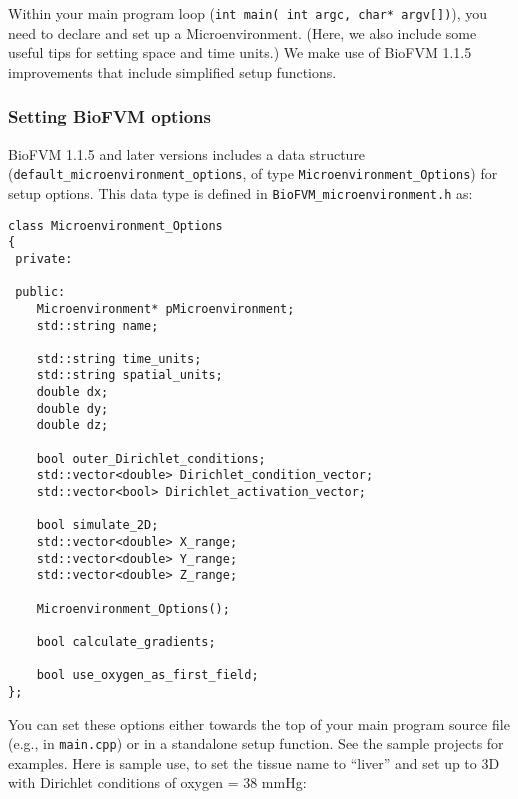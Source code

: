 \documentclass[12pt]{article}
\renewcommand{\v}{\verb}
\begin{document}
Within your main program loop (\v|int main( int argc, char* argv[])|), you need to declare and 
set up a Microenvironment. (Here, we also include some useful tips for setting space and time 
units.) We make use of BioFVM 1.1.5 improvements that 
include simplified setup functions. 

\subsubsection{Setting BioFVM options}
\label{sec:BioFVM_options}
BioFVM 1.1.5 and later versions includes a data structure 
(\verb+default_microenvironment_options+, of type 
\verb+Microenvironment_Options+) for setup options. 
This data type is defined in \verb+BioFVM_microenvironment.h+ as: 
\begin{verbatim}
class Microenvironment_Options
{
 private:
 
 public: 
    Microenvironment* pMicroenvironment;
    std::string name; 
 
    std::string time_units; 
    std::string spatial_units; 
    double dx;
    double dy; 
    double dz; 
    
    bool outer_Dirichlet_conditions; 
    std::vector<double> Dirichlet_condition_vector; 
    std::vector<bool> Dirichlet_activation_vector; 
    
    bool simulate_2D; 
    std::vector<double> X_range; 
    std::vector<double> Y_range; 
    std::vector<double> Z_range; 
    
    Microenvironment_Options(); 
    
    bool calculate_gradients; 
    
    bool use_oxygen_as_first_field;
};
\end{verbatim}

You can set these options either towards the top of your main program source 
file (e.g., in \verb+main.cpp+) or in a standalone setup function. See 
the sample projects for examples. Here is sample use, to set the tissue name to 
``liver'' and set up to 3D with Dirichlet conditions of oxygen = 38 mmHg: 
\end{document}
